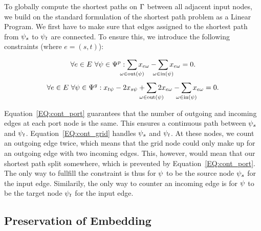 \documentclass{sig-alternate-sigmod09}
\begin{document}
To globally compute the shortest paths on $\Gamma$ between all adjacent input nodes, we build on the standard formulation of the shortest path problem as a Linear Program.
We first have to make sure that edges assigned to the shortest path from $\psi_s$ to $\psi_t$ are connected.
To ensure this, we introduce the following constraints (where $e = (s, t)$):

\newcommand\Psum[1]{\sum_{\makebox[0pt]{$\scriptstyle#1$}}}

\begin{equation}
  \forall \ie \in \iE\ \forall \gv \in \gV^p: \Psum{\ge \in \text{out}(\gv)} \geused{\ie}{\ge} - \Psum{\ge \in \text{in}(\gv)} \geused{\ie}{\ge} = 0. \label{EQ:cont_port}
\end{equation}
\begin{equation}
	\begin{split}
  	\forall \ie \in \iE\ \forall \gv \in \gV^g: x_{t\psi} - 2x_{s\psi} + \Psum{\ge \in \text{out}(\gv)} 2\geused{\ie}{\ge} - \Psum{\ge \in \text{in}(\gv)} \geused{\ie}{\ge} = 0. \label{EQ:cont_grid}
  \end{split}
\end{equation}

Equation~\ref{EQ:cont_port} guarantees that the number of outgoing and incoming edges at each port node is the same.
This ensures a continuous path between $\psi_s$ and $\psi_t$.
%
Equation~\ref{EQ:cont_grid} handles $\psi_s$ and $\psi_t$.
At these nodes, we count an outgoing edge twice, which means that the grid node could only make up for an outgoing edge with two incoming edges.
This, however, would mean that our shortest path split somewhere, which is prevented by Equation~\ref{EQ:cont_port}.
The only way to fullfill the constraint is thus for $\psi$ to be the source node $\psi_s$ for the input edge.
Similarily, the only way to counter an incoming edge is for $\psi$ to be the target node $\psi_t$ for the input edge.

\subsection{Preservation of Embedding}
\end{document}
